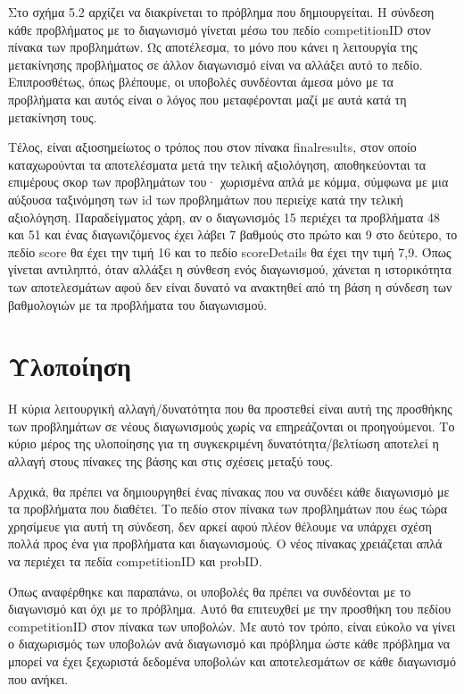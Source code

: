 \documentclass[diploma]{softlab-thesis}
\begin{document}
\bigskip

Στο σχήμα 5.2 αρχίζει να διακρίνεται το πρόβλημα που δημιουργείται. Η σύνδεση
κάθε προβλήματος με το διαγωνισμό γίνεται μέσω του πεδίο competitionID στον πίνακα
των προβλημάτων. Ως αποτέλεσμα, το μόνο που κάνει η λειτουργία της μετακίνησης
προβλήματος σε άλλον διαγωνισμό είναι να αλλάξει αυτό το πεδίο. Επιπροσθέτως,
όπως βλέπουμε, οι υποβολές συνδέονται άμεσα μόνο με τα προβλήματα και αυτός
είναι ο λόγος που μεταφέρονται μαζί με αυτά κατά τη μετακίνηση τους.

\bigskip

Τέλος, είναι αξιοσημείωτος ο τρόπος που στον πίνακα finalresults, στον
οποίο καταχωρούνται τα αποτελέσματα μετά την τελική αξιολόγηση, αποθηκεύονται
τα επιμέρους σκορ των προβλημάτων του· χωρισμένα απλά με κόμμα, σύμφωνα με μια
αύξουσα ταξινόμηση των id των προβλημάτων που περιείχε κατά την τελική αξιολόγηση.
Παραδείγματος χάρη, αν ο διαγωνισμός 15 περιέχει τα προβλήματα 48 και 51 και ένας
διαγωνιζόμενος έχει λάβει 7 βαθμούς στο πρώτο και 9 στο δεύτερο, το πεδίο score θα
έχει την τιμή 16 και το πεδίο scoreDetails θα έχει την τιμή 7,9. Όπως γίνεται
αντιληπτό, όταν αλλάξει η σύνθεση ενός διαγωνισμού, χάνεται η ιστορικότητα των
αποτελεσμάτων αφού δεν είναι δυνατό να ανακτηθεί από τη βάση η σύνδεση των
βαθμολογιών με τα προβλήματα του διαγωνισμού.

\bigskip

\section{Υλοποίηση}

Η κύρια λειτουργική αλλαγή/δυνατότητα που θα προστεθεί είναι αυτή της προσθήκης
των προβλημάτων σε νέους διαγωνισμούς χωρίς να επηρεάζονται οι προηγούμενοι.
Το κύριο μέρος της υλοποίησης για τη συγκεκριμένη δυνατότητα/βελτίωση αποτελεί
η αλλαγή στους πίνακες της βάσης και στις σχέσεις μεταξύ τους.

\bigskip

Αρχικά, θα πρέπει να δημιουργηθεί ένας πίνακας που να συνδέει κάθε διαγωνισμό
με τα προβλήματα που διαθέτει. Το πεδίο στον πίνακα των προβλημάτων που έως
τώρα χρησίμευε για αυτή τη σύνδεση, δεν αρκεί αφού πλέον θέλουμε να υπάρχει
σχέση πολλά προς ένα για προβλήματα και διαγωνισμούς. Ο νέος πίνακας χρειάζεται
απλά να περιέχει τα πεδία competitionID και probID.

\bigskip

Όπως αναφέρθηκε και παραπάνω, οι υποβολές θα πρέπει να συνδέονται με το
διαγωνισμό και όχι με το πρόβλημα. Αυτό θα επιτευχθεί με την προσθήκη του
πεδίου competitionID στον πίνακα των υποβολών. Με αυτό τον τρόπο, είναι εύκολο να
γίνει ο διαχωρισμός των υποβολών ανά διαγωνισμό και πρόβλημα ώστε κάθε πρόβλημα
να μπορεί να έχει ξεχωριστά δεδομένα υποβολών και αποτελεσμάτων σε κάθε
διαγωνισμό που ανήκει.
\end{document}
